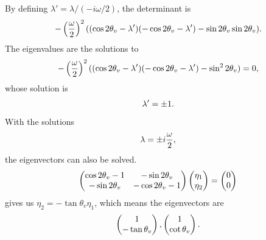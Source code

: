 \documentclass[letterpaper,12pt,english]{sphinxmanual}
\begin{document}
By defining \(\lambda' = \lambda/(-i \omega / 2)\), the determinant is
\begin{gather}
\begin{split}- \left( \frac{\omega}{2} \right)^2   ( (\cos 2\theta_v - \lambda')(-\cos 2\theta_v - \lambda') - \sin 2\theta_v \sin 2\theta_v ) .\end{split}\notag
\end{gather}
The eigenvalues are the solutions to
\begin{gather}
\begin{split}- \left( \frac{\omega}{2} \right)^2   ( (\cos 2\theta_v - \lambda')(-\cos 2\theta_v - \lambda') - \sin^2 2\theta_v  ) =0 ,\end{split}\notag
\end{gather}
whose solution is
\begin{gather}
\begin{split}\lambda' = \pm 1.\end{split}\notag
\end{gather}
With the solutions
\begin{gather}
\begin{split}\lambda = \pm i \frac{\omega}{2},\end{split}\notag
\end{gather}
the eigenvectors can also be solved.
\begin{gather}
\begin{split}\begin{pmatrix}
\cos 2\theta_v - 1 &  -  \sin 2\theta_v \\  - \sin 2\theta_v & - \cos 2\theta_v -1
\end{pmatrix} \begin{pmatrix}
\eta_1 \\ \eta_2
\end{pmatrix} = \begin{pmatrix}
0 \\ 0
\end{pmatrix}\end{split}\notag
\end{gather}
gives us \(\eta_2 = -\tan \theta_v \eta_1\), which means the eigenvectors are
\begin{gather}
\begin{split}\begin{pmatrix}
1  \\ -\tan\theta_v
\end{pmatrix} , \begin{pmatrix}
1 \\ \cot \theta_v
\end{pmatrix}.\end{split}\notag
\end{gather}
\end{document}
